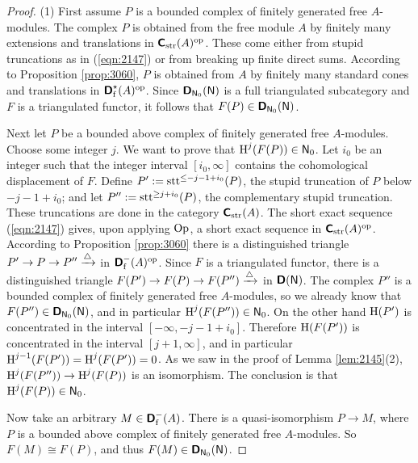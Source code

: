 \begin{proof} \mbox{}

\smallskip \noindent
(1) First assume $P$ is a bounded complex of finitely generated free 
$A$-modules. The complex $P$ is obtained from the free module $A$ by finitely 
many extensions and translations in
$\boldsymbol{\mathsf{C}}_{\mathrm{str}}(A)^{\mathrm{op}}$. These come either from stupid 
truncations as in (\ref{eqn:2147}) or from breaking up finite direct sums. 
According to Proposition \ref{prop:3060}, $P$ is obtained from $A$ 
by finitely many standard cones and translations in 
$\boldsymbol{\mathsf{D}}^{\star}_{\mathrm{f}}(A)^{\mathrm{op}}$. 
Since $\boldsymbol{\mathsf{D}}_{\operatorname{\mathsf{N}}_0}(\operatorname{\mathsf{N}})$ is a full triangulated 
subcategory and $F$ is a triangulated functor, it follows that 
$F(P) \in \boldsymbol{\mathsf{D}}_{\operatorname{\mathsf{N}}_0}(\operatorname{\mathsf{N}})$.

Next let $P$ be a bounded above complex of finitely generated free $A$-modules.
Choose some integer $j$. We want to prove that $\operatorname{H}^j(F(P)) \in \operatorname{\mathsf{N}}_0$. 
Let $i_0$ be an integer such that the integer interval $[i_0, \infty]$ 
contains the cohomological displacement of $F$. 
Define $P' := \operatorname{stt}^{\leq -j - 1 + i_0}(P)$, the stupid truncation of 
$P$ below $-j - 1 + i_0$; and let $P'' := \operatorname{stt}^{\geq j + i_0}(P)$, the 
complementary  stupid truncation. 
These truncations are done in the category 
$\boldsymbol{\mathsf{C}}_{\mathrm{str}}(A)$. 
The short exact sequence (\ref{eqn:2147}) gives, upon applying $\operatorname{Op}$, 
a short exact sequence in 
$\boldsymbol{\mathsf{C}}_{\mathrm{str}}(A)^{\mathrm{op}}$.
According to Proposition \ref{prop:3060} 
there is a distinguished triangle 
$P' \to P \to P'' \xrightarrow{\triangle}$ 
in $\boldsymbol{\mathsf{D}}^-_{\mathrm{f}}(A)^{\mathrm{op}}$.
Since $F$ is a triangulated functor, there is a distinguished triangle 
$F(P') \to F(P) \to F(P'') \xrightarrow{\triangle}$ 
in $\boldsymbol{\mathsf{D}}(\operatorname{\mathsf{N}})$.
The complex $P''$ is a bounded complex of finitely generated 
free $A$-modules, so we already know that
$F(P'') \in \boldsymbol{\mathsf{D}}_{\operatorname{\mathsf{N}}_0}(\operatorname{\mathsf{N}})$,
and in particular $\operatorname{H}^j(F(P'')) \in \operatorname{\mathsf{N}}_0$. 
On the other hand $\operatorname{H}(P')$ is concentrated in the interval 
$[-\infty, -j - 1 + i_0]$. Therefore 
$\operatorname{H}(F(P'))$ is  concentrated in the interval
$[j + 1, \infty]$, and in particular 
$\operatorname{H}^{j - 1}(F(P')) = \operatorname{H}^j(F(P')) = 0$.
As we saw in the proof of Lemma \ref{lem:2145}(2), 
$\operatorname{H}^j(F(P'')) \to \operatorname{H}^j(F(P))$ is an isomorphism. 
The conclusion is that $\operatorname{H}^j(F(P)) \in \operatorname{\mathsf{N}}_0$. 

Now take an arbitrary $M \in \boldsymbol{\mathsf{D}}^-_{\mathrm{f}}(A)$.
There is a quasi-isomorphism $P \to M$, where $P$ is a bounded above complex of 
finitely generated free $A$-modules. So $F(M) \cong F(P)$, and thus 
$F(M) \in \boldsymbol{\mathsf{D}}_{\operatorname{\mathsf{N}}_0}(\operatorname{\mathsf{N}})$. 
 

\end{proof}
